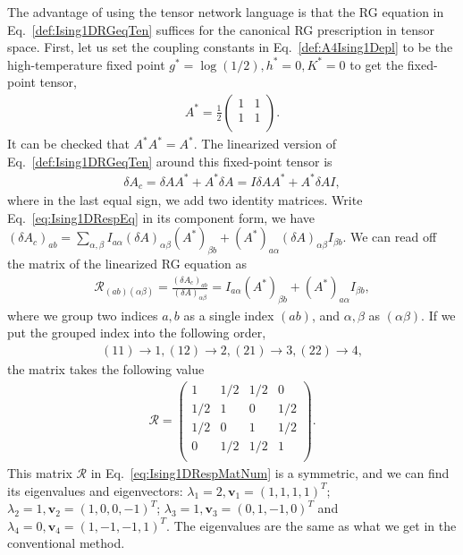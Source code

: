 \documentclass[aps,prr,reprint,superscriptaddress,floatfix]{revtex4-2}
\begin{document}
The advantage of using the tensor network language is that the RG equation in Eq.~\eqref{def:Ising1DRGeqTen} suffices for the canonical RG prescription in tensor space. 
First, let us set the coupling constants in Eq.~\eqref{def:A4Ising1Depl} to be the high-temperature fixed point $g^* = \log{\left(1/2\right)}, h^*=0, K^* = 0$ to get the fixed-point tensor,
%
\begin{align}\label{eq:fixedA4Ising1D}
    A^* = \frac{1}{2}
\begin{pmatrix}
    1 & 1 \\
    1 & 1 \\
\end{pmatrix}.
\end{align}
%
It can be checked that $A^* A^* = A^*$. 
The linearized version of Eq.~\eqref{def:Ising1DRGeqTen} around this fixed-point tensor is
%
\begin{align}\label{eq:Ising1DRespEq}
    \delta A_c = \delta A A^* + A^* \delta A = I \delta A A^* + A^*
    \delta A I,
\end{align}
%
where in the last equal sign, we add two identity matrices. 
Write Eq.~\eqref{eq:Ising1DRespEq} in its component form, we have $\left(\delta A_c\right)_{ab} = \sum_{\alpha,\beta}I_{a\alpha}\left(\delta A\right)_{\alpha\beta} \left(A^*\right)_{\beta b} + \left(A^*\right)_{a\alpha} \left(\delta A\right)_{\alpha \beta} I_{\beta b}$. 
We can read off the matrix of the linearized RG equation as
%
\begin{align}\label{eq:Ising1DRespMat}
    \mathcal{R}_{(ab)(\alpha \beta)} = \frac{\left(\delta
    A_c\right)_{ab}}{\left(\delta A\right)_{\alpha \beta}} =
    I_{a\alpha}\left(A^*\right)_{\beta b} + \left(A^*\right)_{a\alpha}
    I_{\beta b},
\end{align}
%
where we group two indices $a,b$ as a single index $(ab)$, and $\alpha,\beta$ as $(\alpha\beta)$. 
If we put the grouped index into the following order,
%
\begin{align}\label{def:orderConvention}
    (11) \rightarrow 1, (12) \rightarrow 2, (21) \rightarrow 3, (22)
    \rightarrow 4,
\end{align}
%
the matrix takes the following value
%
\begin{align}\label{eq:Ising1DRespMatNum}
    \mathcal{R} = 
\begin{pmatrix}
    1 & 1/2 & 1/2 & 0 \\
    1/2 & 1 & 0 & 1/2 \\
    1/2 & 0 & 1 & 1/2 \\
    0 & 1/2 & 1/2 & 1 \\
\end{pmatrix}.
\end{align}
%
This matrix $\mathcal{R}$ in Eq.~\eqref{eq:Ising1DRespMatNum} is a symmetric, and we can find its eigenvalues and eigenvectors: $\lambda_1 = 2,\mathbf{v}_1 = (1,1,1,1)^T$; $\lambda_2 = 1,\mathbf{v}_2 = (1,0,0,-1)^T$; $\lambda_3 =1, \mathbf{v}_3 = (0,1,-1,0)^T$ and $\lambda_4 = 0, \mathbf{v}_4 = (1,-1,-1,1)^T$. 
The eigenvalues are the same as what we get in the conventional method. 
%
\end{document}
